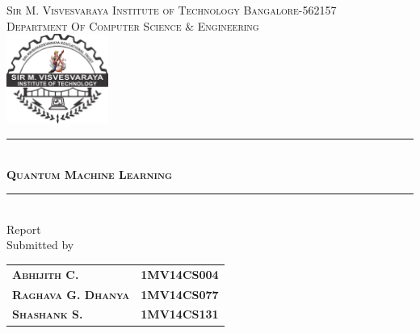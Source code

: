 

\begin{titlepage} %
	\newcommand{\HRule}{\rule{\linewidth}{0.5mm}} %

	\center %

	\LARGE{
        \textsc{ Sir M. Visvesvaraya Institute of Technology Bangalore-562157}\\[30pt] 
    }
	\LARGE{
		\textsc{Department Of Computer Science \& Engineering}\\[30pt]
	}
	\includegraphics[width=0.25\textwidth]{images/mvit.png}\\[30pt] 	


	\HRule\\[20pt]
	\textsc{\Huge \textbf{Quantum Machine Learning}}\\[20pt]
    \HRule\\[20pt]
	\Large{Report}\\[10pt]
	\Large{Submitted by}\\[30pt]
	\begin{tabular}{ l r }
		\textsc{\Large \textbf{Abhijith C.}}       & \Large \textbf{1MV14CS004} \\
		\textsc{\Large \textbf{Raghava G. Dhanya}} & \Large \textbf{1MV14CS077} \\
		\textsc{\Large \textbf{Shashank S.}}       & \Large \textbf{1MV14CS131}
	\end{tabular}\\[15pt]
\par

\end{titlepage}

